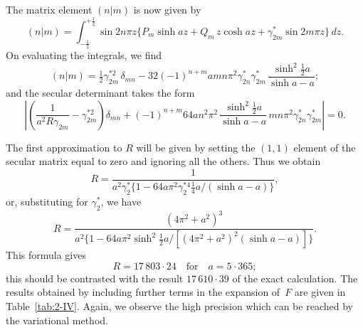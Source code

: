 The matrix element $(n|m)$ is now given by
\begin{equation}
\label{eq:2-317}
(n|m) = \int_{-\frac{1}{2}}^{+\frac{1}{2}} \sin 2n\pi z\{P_m \sinh az + Q_m\,z\cosh az + \gamma_{2m}^*\sin 2m\pi z\}\,dz.
\end{equation}
On evaluating the integrals, we find
\begin{equation}
\label{eq:2-318}
(n|m) = \tfrac{1}{2}\gamma_{2m}^{*2}\,\delta_{mn} - 32(-1)^{n+m} amn\pi^2 \gamma_{2n}^*\gamma_{2m}^*\,\frac{\sinh^2\!\tfrac{1}{2}a}{\sinh a - a};
\end{equation}
and the secular determinant takes the form
\begin{equation}
\label{eq:2-319}
\left|\left(\frac{1}{a^2 R\gamma_{2m}} - \gamma_{2m}^{*2}\right)\delta_{mn} + (-1)^{n+m} 64an^2\pi^2\,\frac{\sinh^2\!\tfrac{1}{2}a}{\sinh a - a}\,mn\pi^2\gamma_{2n}^*\gamma_{2m}^*\right| = 0.
\end{equation}

The first approximation to $R$ will be given by setting the $(1,1)$ element
of the secular matrix equal to zero and ignoring all the others. Thus
we obtain
\begin{equation}
\label{eq:2-320}
R = \frac{1}{a^2\gamma_2^{*}\{1 - 64a\pi^2\gamma_2^{*4}\tfrac{1}{4}a/(\sinh a - a)\}},
\end{equation}
or, substituting for $\gamma_{2}^*$, we have
\begin{equation}
\label{eq:2-321}
R = \frac{(4\pi^2+a^2)^3}{a^2\{1 - 64a\pi^2\sinh^2\!\tfrac{1}{2}a/[(4\pi^2+a^2)^2(\sinh a - a)]\}}.
\end{equation}
This formula gives
\begin{equation}
\label{eq:2-322}
R = 17\,803{\cdot}24 \quad\text{for}\quad a = 5{\cdot}365;
\end{equation}
this should be contrasted with the result $17\,610{\cdot}39$ of the exact calculation.
The results obtained by including further terms in the expansion
of~$F$ are given in Table~\ref{tab:2-IV}. Again, we observe the high precision which
can be reached by the variational method.


